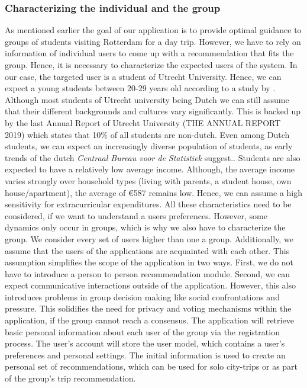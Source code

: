 \documentclass[11pt,a4paper,oneside]{article}
\begin{document}
\subsubsection{Characterizing the individual and the group}
As mentioned earlier the goal of our application is to provide optimal guidance to groups of students visiting Rotterdam for a day trip. However, we have to rely on information of individual users to come up with a recommendation that fits the group. Hence, it is necessary to characterize the expected users of the system. In our case, the targeted user is a student of Utrecht University. Hence, we can expect a young students between 20-29 years old according to a study by \citeauthor{AgeAverage_students}. Although most students of Utrecht university being Dutch we can still assume that their different backgrounds and cultures vary significantly. This is backed up by the last Annual Report of Utrecht University (THE ANNUAL REPORT 2019) which states that 10\% of all students are non-dutch. Even among Dutch students, we can expect an increasingly diverse population of students, as early trends of the dutch \emph{Centraal Bureau voor de Statistiek} suggest.\cite{theovanmiltenburg_AllochtonenHogerOnderwijs_2007}. Students are also expected to have a relatively low average income. Although, the average income varies strongly over household types (living with parents, a student house, own house/apartment), the average of €587 remains low.\cite{kobus_OwnershipOncampusUse_2013} Hence, we can assume a high sensitivity for extracurricular expenditures. All these characteristics need to be considered, if we want to understand a users preferences. However, some dynamics only occur in groups, which is why we also have to characterize the group. We consider every set of users higher than one a group. Additionally, we assume that the users of the applications are acquainted with each other. This assumption simplifies the scope of the application in two ways. First, we do not have to introduce a person to person recommendation module. Second, we can expect communicative interactions outside of the application. However, this also introduces problems in group decision making like social confrontations and pressure. This solidifies the need for privacy and voting mechanisms within the application, if the group cannot reach a consensus.
The application will retrieve basic personal information about each user of the group via the registration process. The user’s account will store the user model, which contains a user's preferences and personal settings. The initial information  is used to create an personal set of recommendations, which can be used for solo city-trips or as part of the group's trip recommendation.
  	
\end{document}
